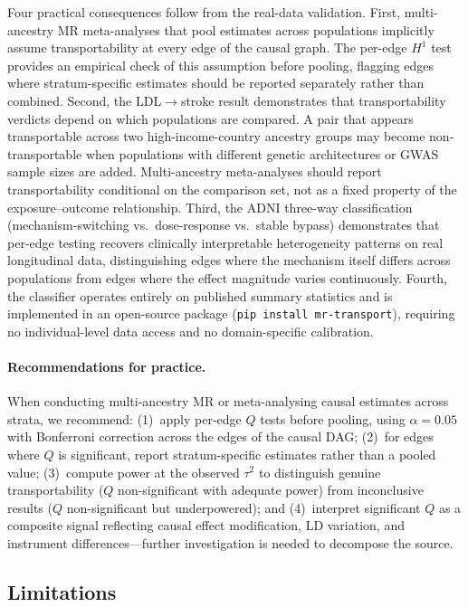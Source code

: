 \documentclass[11pt]{article}
\begin{document}
Four practical consequences follow from the real-data validation.
First, multi-ancestry MR meta-analyses that pool estimates across populations implicitly assume transportability at every edge of the causal graph.
The per-edge $H^1$ test provides an empirical check of this assumption before pooling, flagging edges where stratum-specific estimates should be reported separately rather than combined.
Second, the LDL$\to$stroke result demonstrates that transportability verdicts depend on which populations are compared. A pair that appears transportable across two high-income-country ancestry groups may become non-transportable when populations with different genetic architectures or GWAS sample sizes are added. Multi-ancestry meta-analyses should report transportability conditional on the comparison set, not as a fixed property of the exposure--outcome relationship.
Third, the ADNI three-way classification (mechanism-switching vs.\ dose-response vs.\ stable bypass) demonstrates that per-edge testing recovers clinically interpretable heterogeneity patterns on real longitudinal data, distinguishing edges where the mechanism itself differs across populations from edges where the effect magnitude varies continuously.
Fourth, the classifier operates entirely on published summary statistics and is implemented in an open-source package (\texttt{pip install mr-transport}), requiring no individual-level data access and no domain-specific calibration.

\paragraph{Recommendations for practice.}
When conducting multi-ancestry MR or meta-analysing causal estimates across strata, we recommend: (1)~apply per-edge $Q$ tests before pooling, using $\alpha = 0.05$ with Bonferroni correction across the edges of the causal DAG; (2)~for edges where $Q$ is significant, report stratum-specific estimates rather than a pooled value; (3)~compute power at the observed $\tau^2$ to distinguish genuine transportability ($Q$ non-significant with adequate power) from inconclusive results ($Q$ non-significant but underpowered); and (4)~interpret significant $Q$ as a composite signal reflecting causal effect modification, LD variation, and instrument differences---further investigation is needed to decompose the source.

\subsection{Limitations}
\end{document}
